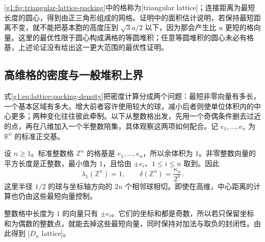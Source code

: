 \cref{g1:fig:triangular-lattice-packing}中的格称为[triangular lattice]；连接距离为最短长度的圆心，得到由正三角形组成的网格。证明中的面积估计说明，若保持最短距离不变，就不能把基本胞的高度压到 \(\sqrt3a/2\) 以下，因为那会产生比 \(u\) 更短的格向量。这里的最优性限于圆心构成满格的等圆堆积；任意等圆堆积的圆心未必有格基，上述论证没有给出这一更大范围的最优性证明。

\subsection{高维格的密度与一般堆积上界}
\label{g1:subsec:B04:05}

式\eqref{g1:eq:lattice-packing-density}把密度计算分成两个问题：最短非零向量有多长，一个基本区域有多大。增大前者容许使用较大的球，减小后者则使单位体积内的中心更多；两种变化往往彼此牵制。以下从整数格出发，先用一个奇偶条件删去过近的点，再在八维加入一个半整数陪集，具体观察这两项如何配合。记 \(e_1,\ldots,e_n\) 为 \(\mathbb R^n\) 的标准正交基。

\begin{example}
	\label{g1:eg:zn-packing-density}
	设 \(n\ge1\)。标准整数格 \(\mathbb Z^n\) 的格基是 \(e_1,\ldots,e_n\)，所以余体积为 \(1\)。非零整数向量的平方长度是正整数，最小值为 \(1\)，且恰由 \(\pm e_i\)、\(1\le i\le n\) 取到。因此
	\[
		\lambda_1(\mathbb Z^n)=1,\qquad
		\delta(\mathbb Z^n)=\frac{\kappa_n}{2^n}.
	\]
	这里半径 \(1/2\) 的球与坐标轴方向的 \(2n\) 个相邻球相切。即使在高维，中心距离的计算也仍由这些最短向量控制。
\end{example}

整数格中长度为 \(1\) 的向量只有 \(\pm e_i\)。它们的坐标和都是奇数，所以若只保留坐标和为偶数的整数点，就能去掉这些最短向量，同时保持对加法与取负的封闭性。由此得到 [\(D_n\) lattice]。

